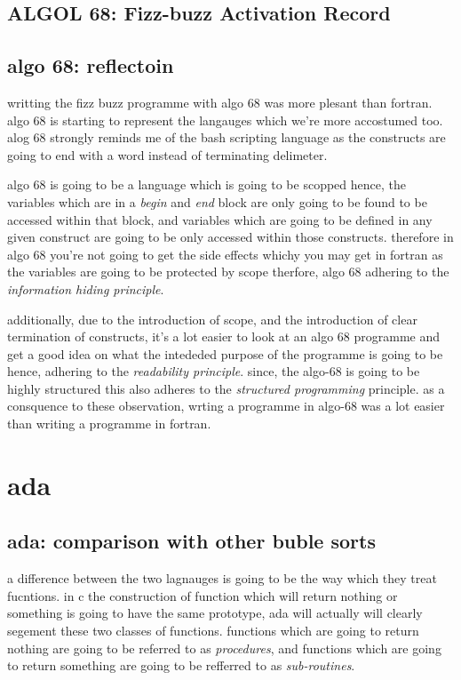 \documentclass[
	12pt, %
]{fphw}
\begin{document}
\subsection{ALGOL 68: Fizz-buzz Activation Record}

\subsection{algo 68: reflectoin}
writting the fizz buzz programme with algo 68 was more plesant than fortran. algo
68 is starting to represent the langauges which we're more accostumed too. alog 68
strongly reminds me of the bash scripting language as the constructs are going
to end with a word instead of terminating delimeter. \par

algo 68 is going to be a language which is going to be scopped hence, the
variables which are in a \emph{begin} and \emph{end} block are only going to be
found to be accessed within that block, and variables which are going to be defined
in any given construct are going to be only accessed within those constructs.
therefore in algo 68 you're not going to get the side effects whichy you may get in
fortran as the variables are going to be protected by scope therfore, algo 68
adhering to the \emph{information hiding principle}. \par

additionally, due to the introduction of scope, and the introduction of clear
termination of constructs, it's a lot easier to look at an algo 68 programme and
get a good idea on what the intededed purpose of the programme is going to be
hence, adhering to the \emph{readability principle}. since, the algo-68 is going
to be highly structured this also adheres to the \emph{structured programming}
principle. as a consquence to these observation, wrting a programme in algo-68
was a lot easier than writing a programme in fortran.

\section{ada}
\subsection{ada: comparison with other buble sorts}
a difference between the two lagnauges is going to be the way which they treat
fucntions. in c the construction of function which will return nothing or something
is going to have the same prototype, ada will actually will clearly segement these
two classes of functions. functions which are going to return nothing are going
to be referred to as \emph{procedures}, and functions which are going to return
something are going to be refferred to as \emph{sub-routines}. \par
\end{document}
